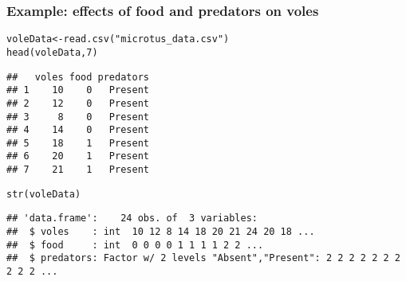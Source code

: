 \documentclass[color=usenames,dvipsnames]{beamer}\usepackage[]{graphicx}\usepackage[]{color}
\makeatletter
\newcommand{\hlnum}[1]{\textcolor[rgb]{0.69,0.494,0}{#1}}%
\newcommand{\hlstr}[1]{\textcolor[rgb]{0.749,0.012,0.012}{#1}}%
\newcommand{\hlopt}[1]{\textcolor[rgb]{0,0,0}{#1}}%
\newcommand{\hlstd}[1]{\textcolor[rgb]{0,0,0}{#1}}%
\newcommand{\hlkwb}[1]{\textcolor[rgb]{0,0.341,0.682}{#1}}%
\newcommand{\hlkwd}[1]{\textcolor[rgb]{0.004,0.004,0.506}{#1}}%
\newenvironment{kframe}{%
 \def\at@end@of@kframe{}%
 \ifinner\ifhmode%
  \def\at@end@of@kframe{\end{minipage}}%
  \begin{minipage}{\columnwidth}%
 \fi\fi%
 \def\FrameCommand##1{\hskip\@totalleftmargin \hskip-\fboxsep
 \colorbox{shadecolor}{##1}\hskip-\fboxsep
     \hskip-\linewidth \hskip-\@totalleftmargin \hskip\columnwidth}%
 \MakeFramed {\advance\hsize-\width
   \@totalleftmargin\z@ \linewidth\hsize
   \@setminipage}}%
 {\par\unskip\endMakeFramed%
 \at@end@of@kframe}
\newenvironment{knitrout}{}{} %
\makeatother
\begin{document}
\begin{frame}[fragile]
  \frametitle{\small Example: effects of food and predators on voles}
  \scriptsize
\begin{knitrout}
\color{fgcolor}\begin{kframe}
\begin{alltt}
\hlstd{voleData} \hlkwb{<-} \hlkwd{read.csv}\hlstd{(}\hlstr{"microtus_data.csv"}\hlstd{)}
\hlkwd{head}\hlstd{(voleData,} \hlnum{7}\hlstd{)}
\end{alltt}
\begin{verbatim}
##   voles food predators
## 1    10    0   Present
## 2    12    0   Present
## 3     8    0   Present
## 4    14    0   Present
## 5    18    1   Present
## 6    20    1   Present
## 7    21    1   Present
\end{verbatim}
\begin{alltt}
\hlkwd{str}\hlstd{(voleData)}
\end{alltt}
\begin{verbatim}
## 'data.frame':	24 obs. of  3 variables:
##  $ voles    : int  10 12 8 14 18 20 21 24 20 18 ...
##  $ food     : int  0 0 0 0 1 1 1 1 2 2 ...
##  $ predators: Factor w/ 2 levels "Absent","Present": 2 2 2 2 2 2 2 2 2 2 ...
\end{verbatim}
\end{kframe}
\end{knitrout}
\end{frame}



\end{document}

